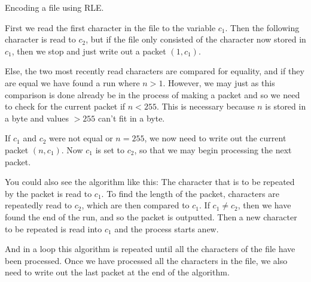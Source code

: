 \begin{algorithm}
  \caption{Encoding a file using RLE.}
  \label{alg:rle-enc}
  \begin{algorithmic}[1]


    \While{\True}


    \If{\eof}
    \Break
    \EndIf

    \Else
    \State {}
    \State {}

    \EndIf

    \EndWhile

    \State {}
    \State {}
  \end{algorithmic}
\end{algorithm}

First we read the first character in the file to the variable
$c_1$. Then the following character is read to $c_2$, but if the file
only consisted of the character now stored in $c_1$, then we stop and
just write out a packet $(1,c_1)$.

Else, the two most recently read characters are compared for equality,
and if they are equal we have found a run where $n > 1$. However, we
may just as this comparison is done already be in the process of
making a packet and so we need to check for the current packet if $n <
255$. This is necessary because $n$ is stored in a byte and values $>
255$ can't fit in a byte.

If $c_1$ and $c_2$ were not equal or $n = 255$, we now need to write
out the current packet $(n,c_1)$. Now $c_1$ is set to $c_2$, so that
we may begin processing the next packet.

You could also see the algorithm like this: The character that is to
be repeated by the packet is read to $c_1$. To find the length of the
packet, characters are repeatedly read to $c_2$, which are then
compared to $c_1$. If $c_1 \neq c_2$, then we have found the end of
the run, and so the packet is outputted. Then a new character to be
repeated is read into $c_1$ and the process starts anew.

And in a loop this algorithm is repeated until all the characters of
the file have been processed. Once we have processed all the
characters in the file, we also need to write out the last packet at
the end of the algorithm.

